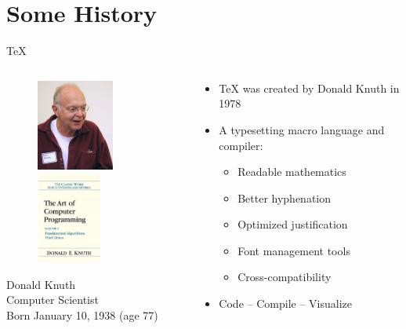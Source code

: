 \documentclass{beamer}
\begin{document}
\section{Some History}

\begin{frame}{\TeX{}}
	\begin{columns}
		\begin{column}{4cm}
			\begin{figure}
   				\includegraphics[height=3cm]{384px-KnuthAtOpenContentAlliance.jpg}
   				\includegraphics[height=3cm]{ArtOfComputerProgramming.jpg}
			\end{figure}
			\begin{center}
				\tiny
				Donald Knuth \\
				Computer Scientist \\
				Born January 10, 1938 (age 77) \\
			\end{center}
		\end{column}
		\begin{column}{6cm}
			\begin{itemize}
				\item \TeX{} was created by Donald Knuth in 1978
				\pause
				\item A typesetting macro language and compiler:
				\begin{itemize}
					\item Readable mathematics
					\item Better hyphenation
					\item Optimized justification
					\item Font management tools
					\item Cross-compatibility
				\end{itemize}
				\pause
				\item Code -- Compile -- Visualize
			\end{itemize}
		\end{column}
	\end{columns}
\end{frame}
\end{document}
